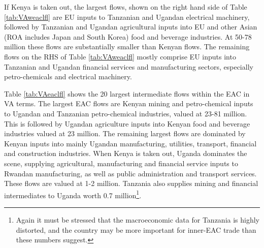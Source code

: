 \documentclass[a4paper]{article}
\begin{document}
If Kenya is taken out, the largest flows, shown on the right hand side of Table \ref{tab:VAweaclfl} are EU inputs to Tanzanian and Ugandan electrical machinery, followed by Tanzanian and Ugandan agricultural inputs into EU and other Asian (ROA includes Japan and South Korea) food and beverage industries. At 50-78 million these flows are substantially smaller than Kenyan flows. The remaining flows on the RHS of Table \ref{tab:VAweaclfl} mostly comprise EU inputs into Tanzanian and Ugandan financial services and manufacturing sectors, especially petro-chemicals and electrical machinery. \newline


Table \ref{tab:VAeaclfl} shows the 20 largest intermediate flows within the EAC in VA terms. %
The largest EAC flows are Kenyan mining and petro-chemical inputs to Ugandan and Tanzanian petro-chemical industries, valued at 23-81 million. This is followed by Ugandan agriculture inputs into Kenyan food and beverage industries valued at 23 million. The remaining largest flows are dominated by Kenyan inputs into mainly Ugandan manufacturing, utilities, transport, financial and construction industries. When Kenya is taken out, Uganda dominates the scene, supplying agricultural, manufacturing and financial service inputs to Rwandan manufacturing, as well as public administration and transport services. These flows are valued at 1-2 million. Tanzania also supplies mining and financial intermediates to Uganda worth 0.7 million\footnote{Again it must be stressed that the macroeconomic data for Tanzania is highly distorted, and the country may be more important for inner-EAC trade than these numbers suggest. }.
\end{document}
